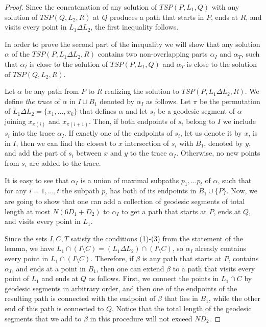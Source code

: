 \begin{proof}
 Since the concatenation of any solution of $TSP(P, L_1, Q)$ with any solution of $TSP(Q, L_2, R)$ at $Q$ produces a path that starts in $P$, ends at $R$, and visits every point in $L_1 \Delta L_2$, the first inequality follows.

 
 In order to prove the second part of the inequality we will show that any solution $\alpha$ of the $TSP(P, L_1 \Delta L_2, R) $ contains two non-overlapping parts $\alpha_I$ and $\alpha_T$, such that $\alpha_I$ is close to the solution of $TSP(P, L_1, Q)$ and $\alpha_T$ is close to the solution of $TSP(Q, L_2, R)$.
 
 Let $\alpha$ be any path from $P$ to $R$ realizing the solution to $TSP(P, L_1 \Delta L_2, R)$. We define \textit{the trace} of $\alpha$ in $I \cup B_1$ denoted by $\alpha_I$ as follows. Let $\pi$ be the permutation of $L_1 \Delta L_2 =\{x_1,\ldots,x_k\}$ that defines $\alpha$ and let $s_i$ be a geodesic segment of $\alpha$ joining $x_{\pi(i)}$ and $x_{\pi(i+1)}$. Then, if both endpoints of $s_i$ belong to $I$ we include $s_i$ into the trace $\alpha_I$. If exactly one of the endpoints of $s_i$, let us denote it  by $x$, is in $I$, then we can find the closest to $x$ intersection of $s_i$ with $B_1$, denoted by $y$, and add the part of $s_i$ between $x$ and $y$ to the trace $\alpha_I$. Otherwise, no new points from $s_i$ are added to the trace.


It is easy to see that $\alpha_I$ is a union of maximal subpaths $p_1,\ldots p_t$ of $\alpha$, such that for any $i=1,\ldots, t$ the subpath $p_t$ has both of its endpoints in $B_1 \cup \{P\}$.  Now, we are going to show that one can add a collection of geodesic segments of total length at most $N(6D_1+D_2)$ to $\alpha_I$  to get a path that starts at $P$, ends at $Q$, and visits every point in $L_1$. 

Since the sets $I,C,T$ satisfy the conditions (1)-(3) from the statement of the lemma, we have $L_1 \cap (I \setminus C) =(L_1 \Delta L_2) \cap (I \setminus C)$, so $\alpha_I$ already contains every point in $L_1 \cap (I \setminus C)$. Therefore, if $\beta$ is any path that starts at $P$, contains $\alpha_I$, and ends at a point in $B_1$, then one can extend $\beta$ to a path that visits every point of $L_1$ and ends at $Q$  as follows.  First, we connect the points in $L_1 \cap C$ by geodesic segments in arbitrary order, and then one of the endpoints of the resulting path is connected with the endpoint of $\beta$ that lies in $B_1$, while  the other end of this path is connected to $Q$. Notice that the total length of the geodesic segments that we add to $\beta$ in this procedure will not exceed $ND_2$.


\end{proof}
